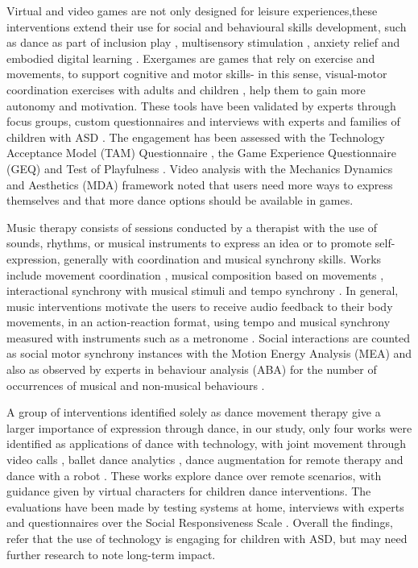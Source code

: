 \documentclass[a4paper,fleqn]{cas-sc}
\begin{document}
Virtual and video games are not only designed for leisure experiences,these interventions extend their use for social and behavioural skills development, such as dance as part of inclusion play \cite{Wasserman19}, multisensory stimulation \cite{Castelhano17}, anxiety relief\cite{AltizerJr18} and embodied digital learning \cite{Martinez-Mones19}. Exergames are games that rely on exercise and movements, to support cognitive and motor skills- in this sense, visual-motor coordination exercises with adults \cite{Caro18} and children \cite{Raygoza-Romero21}, help them to gain more autonomy and motivation. These tools have been validated by experts through focus groups, custom questionnaires and interviews with experts and families of children with ASD \cite{AltizerJr18, Crowell18, Caro17}. The engagement has been assessed with the Technology Acceptance Model (TAM) Questionnaire \cite{Raygoza-Romero21, Vargas20}, the Game Experience Questionnaire (GEQ) \cite{Caro18} and Test of Playfulness \cite{Castelhano17}. Video analysis with the Mechanics Dynamics and Aesthetics (MDA) framework \cite{Wasserman19} noted that users need more ways to express themselves and that more dance options should be available in games.

Music therapy consists of sessions conducted by a therapist with the use of sounds, rhythms, or musical instruments to express an idea or to promote self-expression, generally with coordination and musical synchrony skills. Works include movement coordination \cite{Ragone22, Vargas20}, musical composition based on movements \cite{Ragone20OS, Ma21}, interactional synchrony with musical stimuli \cite{Mcgowan21, McGowan17} and tempo synchrony \cite{Yi-Hsiang18}. In general, music interventions motivate the users to receive audio feedback to their body movements, in an action-reaction format, using tempo and musical synchrony measured with instruments such as a metronome \cite{Yi-Hsiang18}. Social interactions are counted as social motor synchrony instances with the Motion Energy Analysis (MEA) \cite{Ragone22, Ragone20OS} and also as observed by experts in behaviour analysis (ABA) for the number of occurrences of musical and non-musical behaviours \cite{Mcgowan21, McGowan17}. 


A group of interventions identified solely as dance movement therapy give a larger importance of expression through dance, in our study, only four works were identified as applications of dance with technology, with joint movement through video calls \cite{Brown22}, ballet dance analytics \cite{Trajkova20}, dance augmentation for remote therapy \cite{Ringland19} and dance with a robot \cite{Suzuki17}. These works explore dance over remote scenarios, with guidance given by virtual characters for children dance interventions. The evaluations have been made by testing systems at home, interviews with experts \cite{Ringland19} and questionnaires over the Social Responsiveness Scale \cite{Suzuki17}. Overall the findings, refer that the use of technology is engaging for children with ASD, but may need further research to note long-term impact.
\end{document}
